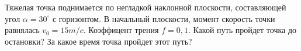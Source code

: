 Тяжелая точка поднимается по негладкой наклонной плоскости, составляющей
угол $\alpha=30 ^{\circ}$ с горизонтом. В начальный плоскости, момент скорость точки равнялась 
$v_{0}= 15 m/c$. Коэффицент трения $f=0,1$. Какой путь пройдет точка до остановки?
За какое время точка пройдет этот путь?